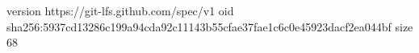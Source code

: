 version https://git-lfs.github.com/spec/v1
oid sha256:5937cd13286c199a94cda92c11143b55cfae37fae1c6c0e45923dacf2ea044bf
size 68
